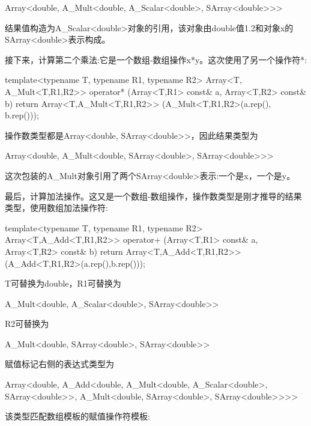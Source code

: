 \begin{cpp}
Array<double, A_Mult<double, A_Scalar<double>, SArray<double>>>
\end{cpp}

结果值构造为A\_Scalar<double>对象的引用，该对象由double值1.2和对象x的SArray<double>表示构成。

接下来，计算第二个乘法:它是一个数组-数组操作x*y。这次使用了另一个操作符*:

\begin{cpp}
template<typename T, typename R1, typename R2>
Array<T, A_Mult<T,R1,R2>>
operator* (Array<T,R1> const& a, Array<T,R2> const& b) {
	return Array<T,A_Mult<T,R1,R2>>
		(A_Mult<T,R1,R2>(a.rep(), b.rep()));
}
\end{cpp}

操作数类型都是Array<double, SArray<double>{}>，因此结果类型为

\begin{cpp}
Array<double, A_Mult<double, SArray<double>, SArray<double>>>
\end{cpp}

这次包装的A\_Mult对象引用了两个SArray<double>表示:一个是x，一个是y。

最后，计算加法操作。这又是一个数组-数组操作，操作数类型是刚才推导的结果类型，使用数组加法操作符:

\begin{cpp}
template<typename T, typename R1, typename R2>
Array<T,A_Add<T,R1,R2>>
operator+ (Array<T,R1> const& a, Array<T,R2> const& b) {
	return Array<T,A_Add<T,R1,R2>>
		(A_Add<T,R1,R2>(a.rep(),b.rep()));
}
\end{cpp}

T可替换为double，R1可替换为

\begin{cpp}
A_Mult<double, A_Scalar<double>, SArray<double>>
\end{cpp}

R2可替换为

\begin{cpp}
A_Mult<double, SArray<double>, SArray<double>>
\end{cpp}

赋值标记右侧的表达式类型为

\begin{cpp}
Array<double,
	A_Add<double,
		A_Mult<double, A_Scalar<double>, SArray<double>>,
		A_Mult<double, SArray<double>, SArray<double>>>>
\end{cpp}

该类型匹配数组模板的赋值操作符模板:

